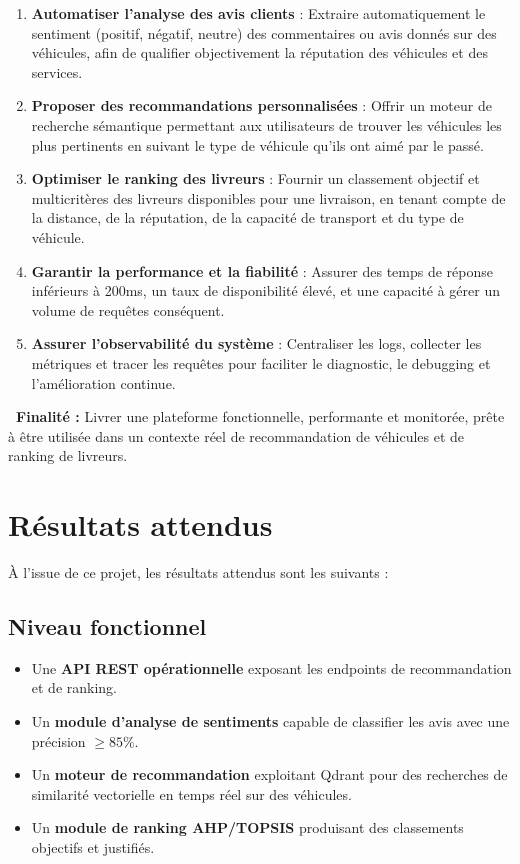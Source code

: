\documentclass[11pt,a4paper]{report}
\begin{document}
\begin{enumerate}
    \item \textbf{Automatiser l'analyse des avis clients} : Extraire automatiquement le sentiment (positif, négatif, neutre) des commentaires ou avis donnés sur des véhicules, afin de qualifier objectivement la réputation des véhicules et des services.

    \item \textbf{Proposer des recommandations personnalisées} : Offrir un moteur de recherche sémantique permettant aux utilisateurs de trouver les véhicules les plus pertinents en suivant le type de véhicule qu'ils ont aimé par le passé.

    \item \textbf{Optimiser le ranking des livreurs} : Fournir un classement objectif et multicritères des livreurs disponibles pour une livraison, en tenant compte de la distance, de la réputation, de la capacité de transport et du type de véhicule.

    \item \textbf{Garantir la performance et la fiabilité} : Assurer des temps de réponse inférieurs à 200ms, un taux de disponibilité élevé, et une capacité à gérer un volume de requêtes conséquent.

    \item \textbf{Assurer l'observabilité du système} : Centraliser les logs, collecter les métriques et tracer les requêtes pour faciliter le diagnostic, le debugging et l'amélioration continue.
\end{enumerate}

\begin{successbox}
    \textbf{\faCheckCircle\ Finalité :} Livrer une plateforme fonctionnelle, performante et monitorée, prête à être utilisée dans un contexte réel de recommandation de véhicules et de ranking de livreurs.
\end{successbox}

\section{Résultats attendus}

À l'issue de ce projet, les résultats attendus sont les suivants :

\subsection*{Niveau fonctionnel}

\begin{itemize}
    \item Une \textbf{API REST opérationnelle} exposant les endpoints de recommandation et de ranking.
    \item Un \textbf{module d'analyse de sentiments} capable de classifier les avis avec une précision $\geq 85\%$.
    \item Un \textbf{moteur de recommandation} exploitant Qdrant pour des recherches de similarité vectorielle en temps réel sur des véhicules.
    \item Un \textbf{module de ranking AHP/TOPSIS} produisant des classements objectifs et justifiés.
\end{itemize}
\end{document}
